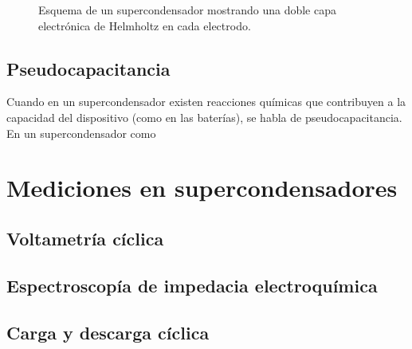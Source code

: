 \begin{figure}[h!]
	\centering
	\caption{Esquema de un supercondensador mostrando una doble capa electrónica de Helmholtz en cada electrodo.}
	\label{fig:edlc}
\end{figure}

\subsection{Pseudocapacitancia}
Cuando en un supercondensador existen reacciones químicas que contribuyen a la capacidad del dispositivo (como en las baterías), se habla de pseudocapacitancia. En un supercondensador como

\section{Mediciones en supercondensadores}
\subsection{Voltametría cíclica}
\subsection{Espectroscopía de impedacia electroquímica}
\subsection{Carga y descarga cíclica}